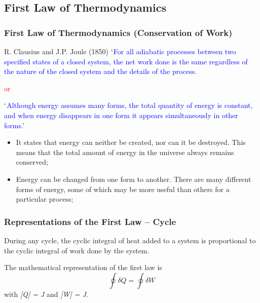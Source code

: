 \documentclass[10pt,compress,handout,ignorenonframetext]{beamer}
\begin{document}
\subsection{First Law of Thermodynamics}
\begin{frame}
 \frametitle{First Law of Thermodynamics (Conservation of Work)}

 \begin{block}{R. Clausius and J.P. Joule (1850)}
  \textcolor{blue}{$\lq$For all adiabatic processes between two specified states of a closed system, the net work done is the same regardless of the nature of the closed system and the details of the process.}
  \begin{center}
   \textcolor{red}{or}
  \end{center}
  \textcolor{blue}{$\lq$Although energy assumes many forms, the total quantity of energy is constant, and when energy disappears in one form it appears simultaneously in other forms.}'
 \end{block}


 \begin{itemize}
  \item<2-> It states that energy can neither be created, nor can it be destroyed. This means that the total amount of energy in the universe always remains conserved;
  \item<3-> Energy can be changed from one form to another. There are many different forms of energy, some of which may be more useful than others for a particular process;
 \end{itemize}

\normalsize
\end{frame}


\begin{frame}
 \frametitle{Representations of the First Law -- Cycle}

 \begin{block}{}During any cycle, the cyclic integral of heat added to a system is proportional to the cyclic integral of work done by the system.\end{block}

 The mathematical representation of the first law is
 \begin{equation}
  \displaystyle\oint \delta Q = \displaystyle\oint \delta W
  \label{Module00:first_law}
 \end{equation}
 with {\it [Q] = J} and {\it [W] = J}.

\end{frame}
\end{document}

